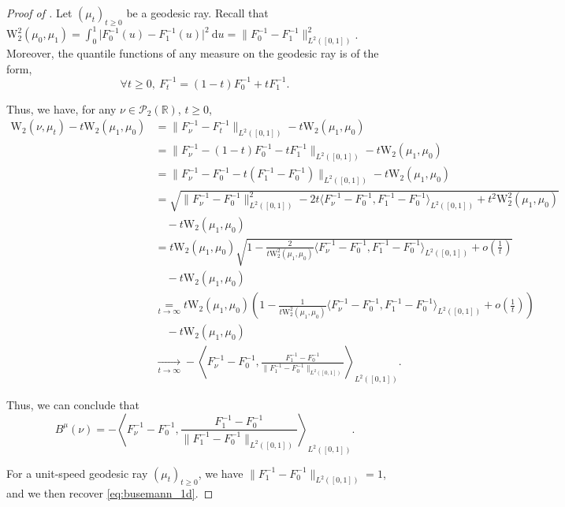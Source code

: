 \documentclass[twoside]{article}
\newcommand{\cP}{\mathcal{P}}
\newcommand{\W}{\mathrm{W}}
\newcommand{\R}{\mathbb{R}}
\begin{document}
\begin{proof}[Proof of ]
    

    Let $(\mu_t)_{t\ge 0}$ be a geodesic ray. Recall that $\W_2^2(\mu_0,\mu_1) = \int_0^1\big|F_0^{-1}(u) - F_1^{-1}(u)\big|^2\ \mathrm{d}u = \|F_0^{-1} - F_1^{-1}\|_{L^2([0,1])}^2$. Moreover, the quantile functions of any measure on the geodesic ray is of the form,
    \begin{equation}
        \forall t\ge 0,\ F_t^{-1} = (1-t)F_0^{-1} + tF_1^{-1}.
    \end{equation}
    
    Thus, we have, for any $\nu\in\cP_2(\R)$, $t\ge 0$,
    \begin{equation}
        \begin{aligned}
            \W_2(\nu,\mu_t) - t \W_2(\mu_1,\mu_0) &= \|F_\nu^{-1}-F_t^{-1}\|_{L^2([0,1])} - t \W_2(\mu_1,\mu_0) \\
            &= \|F_\nu^{-1}-(1-t)F_0^{-1} - tF_1^{-1}\|_{L^2([0,1])} - t \W_2(\mu_1,\mu_0)  \\
            &= \|F_\nu^{-1} - F_0^{-1} - t (F_1^{-1} - F_0^{-1})\|_{L^2([0,1])} - t \W_2(\mu_1,\mu_0)  \\
            &= \sqrt{\|F_{\nu}^{-1}-F_0^{-1}\|_{L^2([0,1])}^2 -2t\langle F_\nu^{-1}-F_0^{-1}, F_1^{-1}-F_0^{-1}\rangle_{L^2([0,1])} + t^2 \W_2^2(\mu_1,\mu_0)} \\&\quad - t \W_2(\mu_1,\mu_0)  \\
            &= t \W_2(\mu_1,\mu_0)  \sqrt{1 - \frac{2}{t \W_2^2(\mu_1,\mu_0)} \langle F_{\nu}^{-1}-F_0^{-1}, F_1^{-1}-F_0^{-1}\rangle_{L^2([0,1])} + o\left(\frac{1}{t}\right)} \\ &\quad - t \W_2(\mu_1,\mu_0)  \\
            &\underset{t\to\infty}{=} t \W_2(\mu_1,\mu_0)  \left(1 - \frac{1}{t \W_2^2(\mu_1,\mu_0) } \langle F_\nu^{-1}-F_0^{-1}, F_1^{-1}-F_0^{-1}\rangle_{L^2([0,1])} + o\left(\frac{1}{t}\right)\right) \\ &\quad - t \W_2(\mu_1,\mu_0)  \\
            &\xrightarrow[t\to\infty]{} -\left\langle F_\nu^{-1}-F_0^{-1}, \frac{F_1^{-1}-F_0^{-1}}{\|F_1^{-1}-F_0^{-1}\|_{L^2([0,1])}}\right\rangle_{L^2([0,1])}.
        \end{aligned}
    \end{equation}

    Thus, we can conclude that 
    \begin{equation}
        B^\mu(\nu) = -\left\langle F_\nu^{-1}-F_0^{-1}, \frac{F_1^{-1}-F_0^{-1}}{\|F_1^{-1}-F_0^{-1}\|_{L^2([0,1])}}\right\rangle_{L^2([0,1])}.
    \end{equation}

    For a unit-speed geodesic ray $(\mu_t)_{t\ge 0}$, we have $\|F_1^{-1}-F_0^{-1}\|_{L^2([0,1])}=1$, and we then recover  \eqref{eq:busemann_1d}.
\end{proof}
\end{document}
